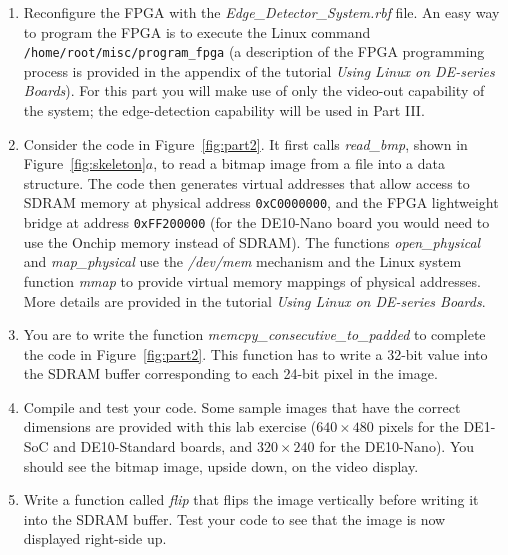 \documentclass[epsfig,10pt,fullpage]{article}
\begin{document}
\begin{enumerate}
\item
Reconfigure the FPGA with the \textit{Edge\_Detector\_System.rbf} file. An easy way to
program the FPGA is to execute the Linux command \texttt{/home/root/misc/program\_fpga}
(a description of the FPGA programming process is provided in the appendix of the 
tutorial \textit{Using Linux on DE-series Boards}). For this part you will make use of only 
the video-out capability of the system; the edge-detection capability will be used in Part III.

\item
Consider the code in Figure~\ref{fig:part2}. It first calls {\it read\_bmp}, shown in 
Figure~\ref{fig:skeleton}$a$, to read a bitmap image from a file into a data structure. 
The code then generates virtual addresses that allow access to SDRAM memory at physical 
address \texttt{0xC0000000}, and the FPGA lightweight bridge at address \texttt{0xFF200000}
(for the DE10-Nano board you would need to use the Onchip memory instead of SDRAM).
The functions {\it open\_physical} and {\it map\_physical} use the {\it /dev/mem} mechanism 
and the Linux system function {\it mmap} to provide virtual memory mappings of physical 
addresses. More details are provided in the tutorial {\it Using Linux on DE-series Boards}. 

\item
You are to write the function {\it memcpy\_consecutive\_to\_padded} to complete the code in 
Figure~\ref{fig:part2}. This function has to write a 32-bit value into the SDRAM buffer
corresponding to each 24-bit pixel in the image.

\item
Compile and test your code. Some sample images that have the correct dimensions are provided with
this lab exercise ($640 \times 480$ pixels for the DE1-SoC and DE10-Standard boards, and $320
\times 240$ for the DE10-Nano). You should see the bitmap image, upside down, on the video
display.

\item
Write a function called {\it flip} that flips the image vertically before writing it into
the SDRAM buffer. Test your code to see that the image is now displayed right-side up.

\end{enumerate}
\end{document}
